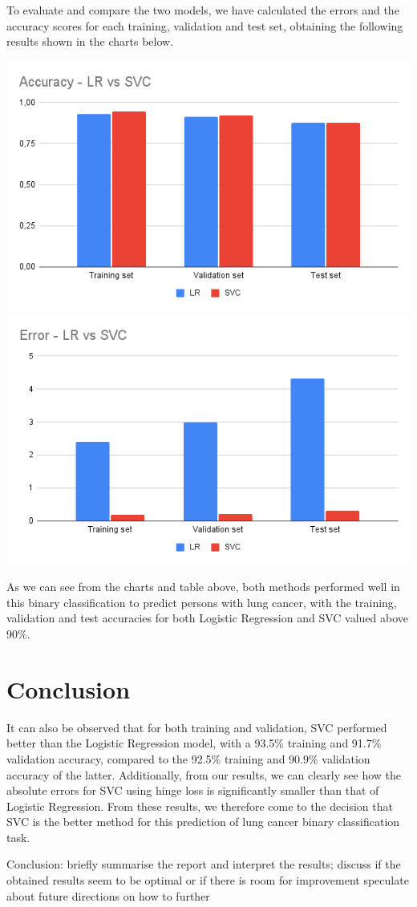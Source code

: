 \documentclass[a4paper,12pt]{article}
\begin{document}
To evaluate and compare the two models, we have calculated the errors and the accuracy scores for each training, validation and test set, obtaining the following results shown in the charts below.

\includegraphics[height=0.3\textwidth]{./graphs/accuracy_chart.png}
\includegraphics[height=0.3\textwidth]{./graphs/error_chart.png}

As we can see from the charts and table above, both methods performed well in this binary classification to predict persons with lung cancer, with the training, validation and test accuracies for both Logistic Regression and SVC valued above 90\%.

\section{Conclusion}
\label{sec:org53c10ba}

It can also be observed that for both training and validation, SVC performed better than the Logistic Regression model, with a 93.5\% training and 91.7\% validation accuracy, compared to the 92.5\% training and 90.9\% validation accuracy of the latter.
Additionally, from our results, we can clearly see how the absolute errors for SVC using hinge loss is significantly smaller than that of Logistic Regression.
From these results, we therefore come to the decision that SVC is the better method for this prediction of lung cancer binary classification task.




Conclusion:
briefly summarise the report and interpret the results;
 discuss if the obtained results seem to be optimal or if there is room for improvement
speculate about future directions on how to further
\end{document}
